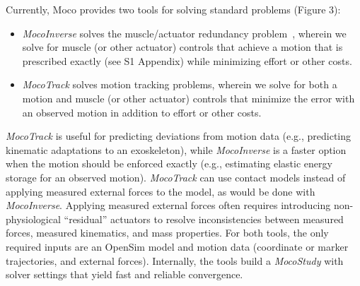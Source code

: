 \documentclass[10pt,letterpaper]{article}
\begin{document}
Currently, Moco provides two tools for solving standard problems (Figure 3):
\begin{itemize}
\item \textit{\textit{MocoInverse}} solves the muscle/actuator redundancy problem~\cite{Groote:2016dq}, wherein we solve for muscle (or other actuator) controls that achieve a motion that is prescribed exactly (see S1 Appendix) while minimizing effort or other costs.
\item \textit{\textit{MocoTrack}} solves motion tracking problems, wherein we solve for both a motion and muscle (or other actuator) controls that minimize the error with an observed motion in addition to effort or other costs.
\end{itemize}
\textit{MocoTrack} is useful for predicting deviations from motion data (e.g., predicting kinematic adaptations to an exoskeleton), while \textit{MocoInverse} is a faster option when the motion should be enforced exactly (e.g., estimating elastic energy storage for an observed motion). \textit{MocoTrack} can use contact models instead of applying measured external forces to the model, as would be done with \textit{MocoInverse}. Applying measured external forces often requires introducing non-physiological “residual” actuators to resolve inconsistencies between measured forces, measured kinematics, and mass properties. For both tools, the only required inputs are an OpenSim model and motion data (coordinate or marker trajectories, and external forces). Internally, the tools build a \textit{MocoStudy} with solver settings that yield fast and reliable convergence.
\end{document}
